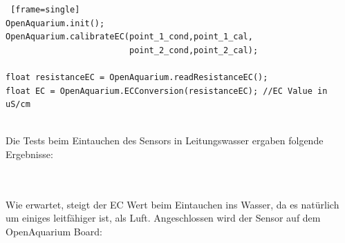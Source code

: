 \begin{lstlisting} [frame=single]
OpenAquarium.init();
OpenAquarium.calibrateEC(point_1_cond,point_1_cal,
                         point_2_cond,point_2_cal);

float resistanceEC = OpenAquarium.readResistanceEC();
float EC = OpenAquarium.ECConversion(resistanceEC); //EC Value in uS/cm
\end{lstlisting}
\newpage \mbox{} \\
Die Tests beim Eintauchen des Sensors in Leitungswasser ergaben folgende Ergebnisse: \\ \\
\begin{minipage}{5in}
  \centering
\end{minipage}
\vskip0.5cm \mbox{} \\
Wie erwartet, steigt der EC Wert beim Eintauchen ins Wasser, da es nat\"urlich um einiges leitf\"ahiger ist, als Luft.
Angeschlossen wird der Sensor auf dem OpenAquarium Board: \\
\begin{minipage}{5in}
  \centering
\end{minipage}
\newpage

